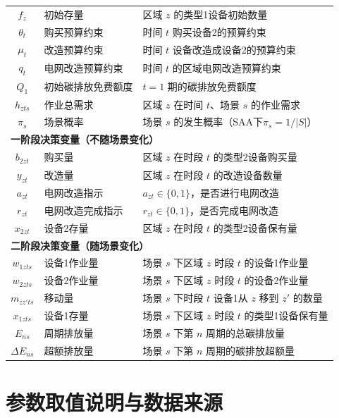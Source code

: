 \documentclass[12pt,a4paper]{article}
\newcommand{\手批注}[2]{\textcolor{#1}{\text{\kaishu #2}}}
\newcommand{\一阶段}{\textcolor{firststage}{\text{\kaishu （一阶段）}}}
\newcommand{\二阶段}{\textcolor{secondstage}{\text{\kaishu （二阶段）}}}
\begin{document}
\begin{footnotesize}
\begin{longtable}{clp{7.5cm}}
$f_z$ & 初始存量 & 区域 $z$ 的类型1设备初始数量 \\
$\theta_t$ & 购买预算约束 & 时间 $t$ 购买设备2的预算约束 \\
$\mu_t$ & 改造预算约束 & 时间 $t$ 设备改造成设备2的预算约束 \\
$q_t$ & 电网改造预算约束 & 时间 $t$ 的区域电网改造预算约束 \\
$Q_1$ & 初始碳排放免费额度 & $t=1$ 期的碳排放免费额度 \\
$h_{zts}$ & 作业总需求 & 区域 $z$ 在时间 $t$、场景 $s$ 的作业需求 \\
$\pi_s$ & 场景概率 & 场景 $s$ 的发生概率（SAA下$\pi_s=1/|S|$） \\
\midrule
\multicolumn{3}{l}{\textbf{一阶段决策变量（不随场景变化）}} \\
$b_{2zt}$ & 购买量 & 区域 $z$ 在时段 $t$ 的类型2设备购买量 \\
$y_{zt}$ & 改造量 & 区域 $z$ 在时段 $t$ 的改造设备数量 \\
$a_{zt}$ & 电网改造指示 & $a_{zt} \in \{0,1\}$，是否进行电网改造 \\
$r_{zt}$ & 电网改造完成指示 & $r_{zt} \in \{0,1\}$，是否完成电网改造 \\
$x_{2zt}$ & 设备2存量 & 区域 $z$ 在时段 $t$ 的类型2设备保有量 \\
\midrule
\multicolumn{3}{l}{\textbf{二阶段决策变量（随场景变化）}} \\
$w_{1zts}$ & 设备1作业量 & 场景 $s$ 下区域 $z$ 时段 $t$ 的设备1作业量 \\
$w_{2zts}$ & 设备2作业量 & 场景 $s$ 下区域 $z$ 时段 $t$ 的设备2作业量 \\
$m_{zz'ts}$ & 移动量 & 场景 $s$ 下时段 $t$ 设备1从 $z$ 移到 $z'$ 的数量 \\
$x_{1zts}$ & 设备1存量 & 场景 $s$ 下区域 $z$ 时段 $t$ 的类型1设备保有量 \\
$E_{ns}$ & 周期排放量 & 场景 $s$ 下第 $n$ 周期的总碳排放量 \\
$\Delta E_{ns}$ & 超额排放量 & 场景 $s$ 下第 $n$ 周期的碳排放超额量 \\
\bottomrule
\end{longtable}
\end{footnotesize}


\newpage
\section{参数取值说明与数据来源}
\end{document}
